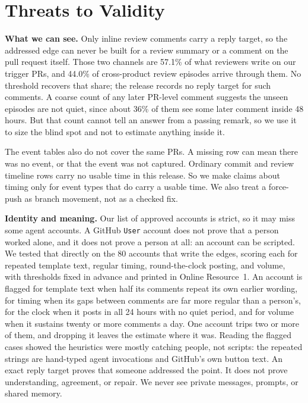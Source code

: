 \documentclass[lineno,pdflatex,sn-basic]{sn-jnl}
\begin{document}
\section{Threats to Validity}\label{sec:threats}

\textbf{What we can see.} Only inline review comments carry a reply target, so
the addressed edge can never be built for a review summary or a comment on the
pull request itself. Those two channels are 57.1\% of what reviewers write on our trigger PRs, and
44.0\% of cross-product review episodes arrive through them. No
threshold recovers that share; the release records no reply target for such comments. A
coarse count of any later PR-level comment suggests the unseen episodes are not quiet, since about 36\% of them see some
later comment inside 48 hours. But that count cannot tell an answer from a
passing remark, so we use it to size the blind
spot and not to estimate anything inside it.

The event tables also do not cover the same PRs. A missing row can mean there was
no event, or that the event was not captured. Ordinary
commit and review timeline rows carry no usable time in this release. So we
make claims about timing only for event types that do carry a usable time. We
also treat a force-push as branch movement, not as a checked fix.

\textbf{Identity and meaning.} Our list of approved accounts is strict, so it may miss some agent accounts. A
GitHub \texttt{User} account does not prove that a person worked alone, and it
does not prove a person at all: an account can be scripted. We tested that
directly on the 80 accounts that write the edges, scoring each for repeated
template text, regular timing, round-the-clock posting, and volume, with
thresholds fixed in advance and printed in Online Resource~1. An account is
flagged for template text when half its comments repeat its own earlier wording,
for timing when its gaps between comments are far more regular than a person's,
for the clock when it posts in all 24 hours with no quiet period, and for volume
when it sustains twenty or more comments a day. One account trips two or more of them, and dropping
it leaves the estimate where it was. Reading the flagged cases showed the
heuristics were mostly catching people, not scripts: the repeated strings are
hand-typed agent invocations and GitHub's own button text. An exact reply target proves that someone addressed the
point. It does not prove understanding, agreement, or repair. We never see
private messages, prompts, or shared memory.
\end{document}

